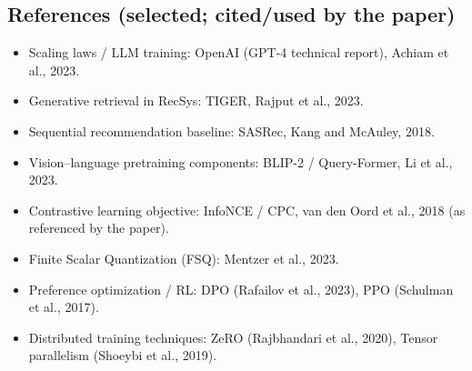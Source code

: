 \documentclass{article}
\begin{document}
\subsection*{References (selected; cited/used by the paper)}
\begin{itemize}
  \item Scaling laws / LLM training: OpenAI (GPT-4 technical report), Achiam et al., 2023.
  \item Generative retrieval in RecSys: TIGER, Rajput et al., 2023.
  \item Sequential recommendation baseline: SASRec, Kang and McAuley, 2018.
  \item Vision--language pretraining components: BLIP-2 / Query-Former, Li et al., 2023.
  \item Contrastive learning objective: InfoNCE / CPC, van den Oord et al., 2018 (as referenced by the paper).
  \item Finite Scalar Quantization (FSQ): Mentzer et al., 2023.
  \item Preference optimization / RL: DPO (Rafailov et al., 2023), PPO (Schulman et al., 2017).
  \item Distributed training techniques: ZeRO (Rajbhandari et al., 2020), Tensor parallelism (Shoeybi et al., 2019).
\end{itemize}
\end{document}
